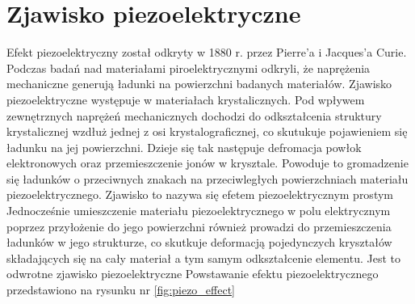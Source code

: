 \chapter{Zjawisko piezoelektryczne }
\label{sec:introduction}

Efekt piezoelektryczny został odkryty w 1880 r. przez Pierre’a i Jacques’a Curie. 
Podczas badań nad materiałami piroelektrycznymi odkryli, że naprężenia mechaniczne
generują ładunki na powierzchni badanych materiałów. Zjawisko piezoelektryczne 
występuje w materiałach krystalicznych. Pod wpływem zewnętrznych naprężeń mechanicznych 
dochodzi do odkształcenia struktury krystalicznej wzdłuż jednej z osi krystalograficznej, 
co skutukuje pojawieniem się ładunku na jej powierzchni. Dzieje się tak 
następuje defromacja powłok elektronowych oraz przemieszczenie jonów w krysztale.
Powoduje to gromadzenie się ładunków o przeciwnych znakach na przeciwległych
powierzchniach materiału piezoelektrycznego. Zjawisko to nazywa się efetem 
piezoelektrycznym prostym \cite{pvdf_exp}
Jednocześnie 
umieszczenie materiału piezoelektrycznego w polu elektrycznym poprzez przyłożenie 
do jego powierzchni również prowadzi do przemieszczenia ładunków w jego strukturze, 
co skutkuje deformacją pojedynczych kryształów składających się na cały materiał a tym 
samym odkształcenie elementu. Jest to odwrotne zjawisko piezoelektryczne \cite{pvdf_exp}
Powstawanie efektu piezoelektrycznego przedstawiono na rysunku nr \ref{fig:piezo_effect}

